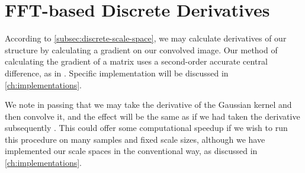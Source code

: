 \chapter{FFT-based Discrete Derivatives}

According to \cref{subsec:discrete-scale-space}, we may calculate derivatives of our structure by calculating a gradient on our convolved image. Our method of calculating the gradient of a matrix uses a second-order accurate central difference, as in \cite{fornberg-1988}. Specific implementation will be discussed in \cref{ch:implementations}.

We note in passing that we may take the derivative of the Gaussian kernel and then convolve it, and the effect will be the same as if we had taken the derivative subsequently \cite{DIPGW}. This could offer some computational speedup if we wish to run this procedure on many samples and fixed scale sizes, although we have implemented our scale spaces in the conventional way, as discussed in \cref{ch:implementations}.

%
%   	
%   	


